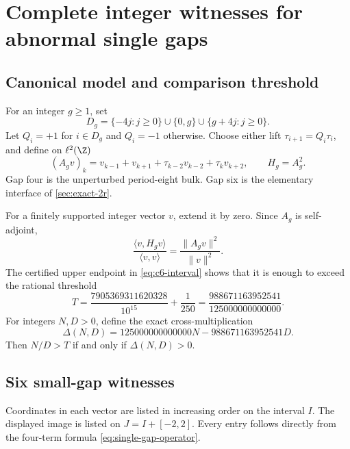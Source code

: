 \section{Complete integer witnesses for abnormal single gaps}
\label{sec:single-gap}

\subsection{Canonical model and comparison threshold}

For an integer \(g\geq1\), set
\[
 D_g=\{-4j:j\geq0\}\cup\{0,g\}\cup\{g+4j:j\geq0\}.
\]
Let \(Q_i=+1\) for \(i\in D_g\) and \(Q_i=-1\) otherwise.  Choose either
lift \(\tau_{i+1}=Q_i\tau_i\), and define on \(\ell^2(\Z)\)
\begin{equation}
 (A_gv)_k=v_{k-1}+v_{k+1}+\tau_{k-2}v_{k-2}+\tau_kv_{k+2},
 \qquad H_g=A_g^2.
 \label{eq:single-gap-operator}
\end{equation}
Gap four is the unperturbed period-eight bulk.  Gap six is the elementary
interface of \cref{sec:exact-2r}.

For a finitely supported integer vector \(v\), extend it by zero.  Since
\(A_g\) is self-adjoint,
\begin{equation}
 \frac{\langle v,H_gv\rangle}{\langle v,v\rangle}
 =\frac{\|A_gv\|^2}{\|v\|^2}.
 \label{eq:rayleigh}
\end{equation}
The certified upper endpoint in \eqref{eq:c6-interval} shows that it is
enough to exceed the rational threshold
\begin{equation}
 T=\frac{7905369311620328}{10^{15}}+\frac1{250}
 =\frac{988671163952541}{125000000000000}.
 \label{eq:T}
\end{equation}
For integers \(N,D>0\), define the exact cross-multiplication
\begin{equation}
 \Delta(N,D)=125000000000000N-988671163952541D.
 \label{eq:Delta}
\end{equation}
Then \(N/D>T\) if and only if \(\Delta(N,D)>0\).

\subsection{Six small-gap witnesses}

Coordinates in each vector are listed in increasing order on the interval
\(I\).  The displayed image is listed on \(J=I+[-2,2]\).  Every entry follows
directly from the four-term formula \eqref{eq:single-gap-operator}.


